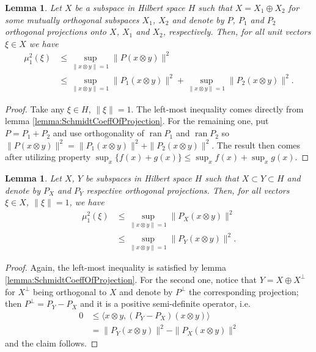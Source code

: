 \documentclass[reqno]{amsart}
\theoremstyle{plain}
\newtheorem{lemma}[theorem]{Lemma}
\theoremstyle{note}
\newcommand{\ran}[1]{\operatorname{ran}{#1}}
\newcommand{\iprod}[2]{\langle #1 , #2 \rangle}
\begin{document}
\begin{lemma}\label{lemma:SchmidtCoeffOfDirectSum}
    Let $X$ be a subspace in Hilbert space $H$ such that $X = X_1 \oplus X_2$ for some mutually orthogonal subspaces $X_1$, $X_2$ and denote by $P$, $P_1$ and $P_2$ orthogonal projections onto $X$, $X_1$ and $X_2$, respectively. Then, for all unit vectors $\xi \in X$ we have
    \begin{align}
        \mu_{1}^{2}(\xi) &\leqslant \sup_{\|x\otimes y\|=1}{\|P (x\otimes y)\|^{2}} \\
        &\leqslant \sup_{\|x\otimes y\|=1}{\|P_1 (x\otimes y)\|^{2}} + \sup_{\|x\otimes y\|=1}{\|P_2 (x\otimes y)\|^{2}}.\nonumber
    \end{align}
\end{lemma}

\begin{proof}
    Take any $\xi \in H$, $\|\xi\| = 1$. The left-most inequality comes directly from lemma \ref{lemma:SchmidtCoeffOfProjection}. For the remaining one, put $P = P_1 + P_2$ and use orthogonality of $\ran{P_1}$ and $\ran{P_2}$ so $\| P (x\otimes y) \|^2 = \| P_1 (x\otimes y) \|^2 + \| P_2 (x\otimes y) \|^2$. The result then comes after utilizing property $\sup_{x}{\{f(x)+g(x)\}} \leqslant \sup_{x}{f(x)} + \sup_{x}{g(x)}$.
\end{proof}

\begin{lemma}\label{lemma:SchmidtCoeffOfSubspace}
    Let $X$, $Y$ be subspaces in Hilbert space $H$ such that $X\subset Y\subset H$ and denote by $P_X$ and $P_Y$ respective orthogonal projections. Then, for all vectors $\xi \in X$, $\|\xi \| = 1$, we have
    \begin{align}
        \mu_{1}^{2}(\xi) &\leqslant \sup_{\|x\otimes y\| = 1}{\|P_X (x\otimes y)\|^{2}} \\
        &\leqslant \sup_{\|x\otimes y\| = 1}{\|P_Y (x\otimes y)\|^{2}}.\nonumber
    \end{align}
\end{lemma}

\begin{proof}
    Again, the left-most inequality is satisfied by lemma \ref{lemma:SchmidtCoeffOfProjection}. For the second one, notice that $Y = X \oplus X^\perp$ for $X^\perp$ being orthogonal to $X$ and denote by $P^\perp$ the corresponding projection; then $P^\perp = P_Y - P_X$ and it is a positive semi-definite operator, i.e.
    \begin{align}
        0 &\leqslant \iprod{x\otimes y}{(P_Y-P_X)(x\otimes y)} \\
        &= \|P_Y(x\otimes y)\|^{2} - \|P_X(x\otimes y)\|^{2} \nonumber
    \end{align}
and the claim follows.
\end{proof}
\end{document}
